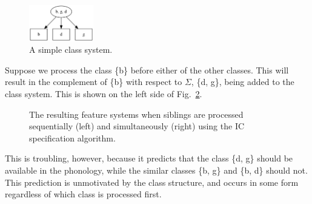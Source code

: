 \documentclass[12pt, oneside]{article}   	%
\begin{document}
\begin{figure}[htb!]
	\centering
	\includegraphics[width=0.25\textwidth]{sibling_input.png}
	\caption{A simple class system.}
	\label{fig:siblinginput}
\end{figure}

Suppose we process the class \{b\} before either of the other classes. This will result in the complement of \{b\} with respect to $\Sigma$, \{d, g\}, being added to the class system. This is shown on the left side of Fig.~\ref{fig:siblingoutput}.

\begin{figure}[h]
	\centering
	\qquad
	\caption{The resulting feature systems when siblings are processed sequentially (left) and simultaneously (right) using the IC specification algorithm.}
	\label{fig:siblingoutput}
\end{figure}


This is troubling, however, because it predicts that the class \{d, g\} should be available in the phonology, while the similar classes \{b, g\} and \{b, d\} should not. This prediction is unmotivated by the class structure, and occurs in some form regardless of which class is processed first.
\end{document}
